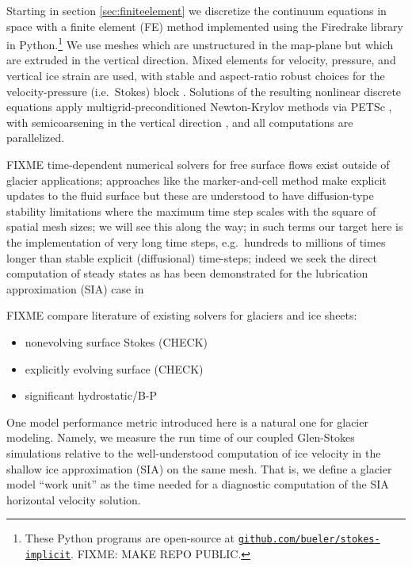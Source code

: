 \documentclass[letterpaper,final,12pt,reqno]{amsart}
\begin{document}
Starting in section \ref{sec:finiteelement} we discretize the continuum equations in space with a finite element (FE) method \cite{Elmanetal2014} implemented using the Firedrake library \cite{Rathgeberetal2016} in Python.\footnote{These Python programs are open-source at \href{https://github.com/bueler/stokes-implicit}{\texttt{github.com/bueler/stokes-implicit}}.  FIXME: MAKE REPO PUBLIC.}  We use meshes which are unstructured in the map-plane but which are extruded \cite{Bercea2016,Gibsonetal2019,McRaeetal2016} in the vertical direction.  Mixed elements for velocity, pressure, and vertical ice strain are used, with stable and aspect-ratio robust choices for the velocity-pressure (i.e.~Stokes) block \cite{Elmanetal2014}.  Solutions of the resulting nonlinear discrete equations apply multigrid-preconditioned Newton-Krylov methods \cite{Bueler2021} via PETSc \cite{Balayetal2020}, with semicoarsening in the vertical direction \cite{Tuminaroetal2016}, and all computations are parallelized.

FIXME time-dependent numerical solvers for free surface flows exist outside of glacier applications; approaches like the marker-and-cell method \cite{HarlowWelch1965} make explicit updates to the fluid surface but these are understood to have diffusion-type stability limitations where the maximum time step scales with the square of spatial mesh sizes; we will see this along the way; in such terms our target here is the implementation of very long time steps, e.g.~hundreds to millions of times longer than stable explicit (diffusional) time-steps; indeed we seek the direct computation of steady states as has been demonstrated for the lubrication approximation (SIA) case in \cite{Bueler2016}

FIXME compare literature of existing solvers for glaciers and ice sheets:
\begin{itemize}
\item  nonevolving surface Stokes \cite{IsaacStadlerGhattas2015,Lengetal2013,Lengetal2014a,Zwingeretal2007} (CHECK)
\item  explicitly evolving surface \cite{Gudmundsson1999,HelanowAhlkrona2018,Jouvetetal2008,Larouretal2012,
Lengetal2014b,Lengetal2012,LeysingerGudmundsson2004,PralongFunk2004,Seddiketal2012} (CHECK)
\item significant hydrostatic/B-P \cite{BrownSmithAhmadia2013,Tuminaroetal2016}
\end{itemize}

One model performance metric introduced here is a natural one for glacier modeling.  Namely, we measure the run time of our coupled Glen-Stokes simulations relative to the well-understood computation of ice velocity in the shallow ice approximation (SIA) \cite{Fowler1997} on the same mesh.  That is, we define a glacier model ``work unit'' as the time needed for a diagnostic computation of the SIA horizontal velocity solution.
\end{document}

